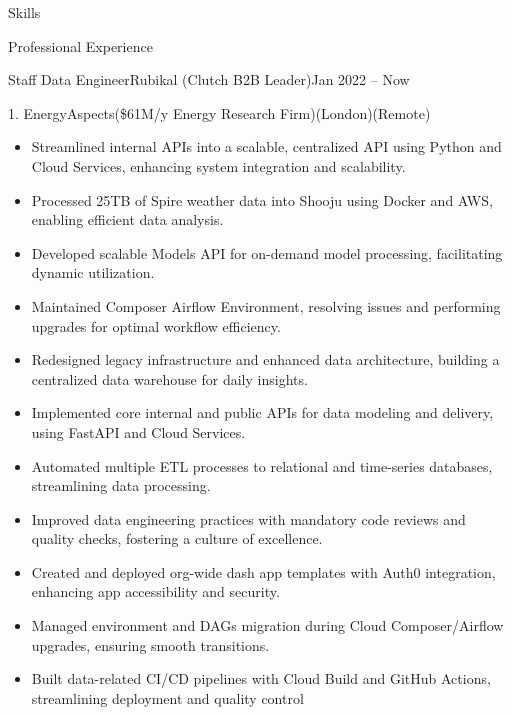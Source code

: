 \documentclass[]{ahmedamrcv}
\begin{document}
\begin{cvsection}{Skills}
\begin{cvsection}{Professional Experience}
\begin{cvsubsection}{Staff Data Engineer}{Rubikal (Clutch B2B Leader)}{Jan 2022 -- Now}
\begin{cvsubsection}{1. EnergyAspects}{(\$61M/y Energy Research Firm)}{(London)(Remote)}
\begin{itemize}
                        \item Streamlined internal APIs into a scalable, centralized API using Python and Cloud Services, enhancing system integration and scalability.
                            
                        \item Processed 25TB of Spire weather data into Shooju using Docker and AWS, enabling efficient data analysis.
                            
                        \item Developed scalable Models API for on-demand model processing, facilitating dynamic utilization.
                            
                        \item Maintained Composer Airflow Environment, resolving issues and performing upgrades for optimal workflow efficiency.
                            
                        \item Redesigned legacy infrastructure and enhanced data architecture, building a centralized data warehouse for daily insights.
                            
                        \item Implemented core internal and public APIs for data modeling and delivery, using FastAPI and Cloud Services.
                            
                        \item Automated multiple ETL processes to relational and time-series databases, streamlining data processing.
                            
                        \item Improved data engineering practices with mandatory code reviews and quality checks, fostering a culture of excellence.

                        \item Created and deployed org-wide dash app templates with Auth0 integration, enhancing app accessibility and security.

                        \item Managed environment and DAGs migration during Cloud Composer/Airflow upgrades, ensuring smooth transitions.

                        \item Built data-related CI/CD pipelines with Cloud Build and GitHub Actions, streamlining deployment and quality control
    			\end{itemize}
    		\end{cvsubsection}
    

\end{cvsubsection}
\end{cvsection}
\end{cvsection}
\end{document}
